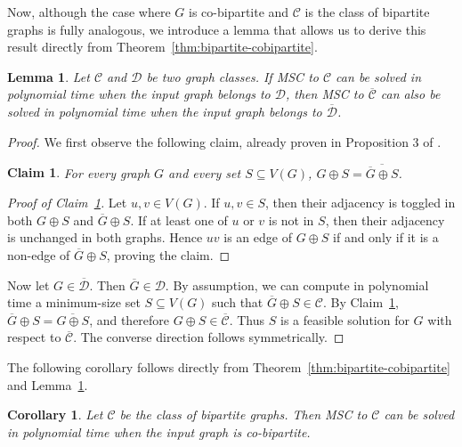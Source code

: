 \documentclass[11pt]{article}
\newtheorem{lemma}[theorem]{Lemma}
\newtheorem{corollary}[theorem]{Corollary}
\newtheorem{claim}[theorem]{Claim}
\theoremstyle{definition}
\begin{document}
Now, although the case where $G$ is co-bipartite and $\mathcal{C}$ is the class of bipartite graphs is fully analogous, we introduce a lemma that allows us to derive this result directly from Theorem~\ref{thm:bipartite-cobipartite}.


\begin{lemma}
\label{lem:complement-transfer}
Let $\mathcal{C}$ and $\mathcal{D}$ be two graph classes.
If MSC to $\mathcal{C}$ can be solved in polynomial time
when the input graph belongs to $\mathcal{D}$, then
MSC to $\overline{\mathcal{C}}$ can also be solved in polynomial time
when the input graph belongs to $\overline{\mathcal{D}}$.
\end{lemma}

\begin{proof}
We first observe the following claim, already proven in Proposition 3 of \cite{DBLP:journals/algorithmica/AntonyGPSSS22}.
\begin{claim}
\label{claim:complement-commutes}
For every graph $G$ and every set $S \subseteq V(G)$,
$G \oplus S = \overline{\overline{G} \oplus S}$.
\end{claim}

\begin{proof}[Proof of Claim~\ref{claim:complement-commutes}]
Let $u,v \in V(G)$.
If $u,v \in S$, then their adjacency is toggled in both
$G \oplus S$ and $\overline{G} \oplus S$.
If at least one of $u$ or $v$ is not in $S$, then their adjacency is
unchanged in both graphs.
Hence $uv$ is an edge of $G \oplus S$ if and only if it is a non-edge of
$\overline{G} \oplus S$, proving the claim.
\end{proof}
Now let $G \in \overline{\mathcal{D}}$.
Then $\overline{G} \in \mathcal{D}$.
By assumption, we can compute in polynomial time a minimum-size set
$S \subseteq V(G)$ such that $\overline{G} \oplus S \in \mathcal{C}$.
By Claim~\ref{claim:complement-commutes},
$\overline{G} \oplus S = \overline{G \oplus S}$, and therefore
$G \oplus S \in \overline{\mathcal{C}}$.
Thus $S$ is a feasible solution for $G$ with respect to
$\overline{\mathcal{C}}$.
The converse direction follows symmetrically.
\end{proof}

The following corollary follows directly from Theorem~\ref{thm:bipartite-cobipartite} and Lemma~\ref{lem:complement-transfer}.

\begin{corollary}
\label{cor:co-bipartite-bipartite}
Let $\mathcal{C}$ be the class of bipartite graphs. 
Then MSC to $\mathcal{C}$ can be solved in polynomial time when the input graph is co-bipartite.
\end{corollary}
\end{document}
